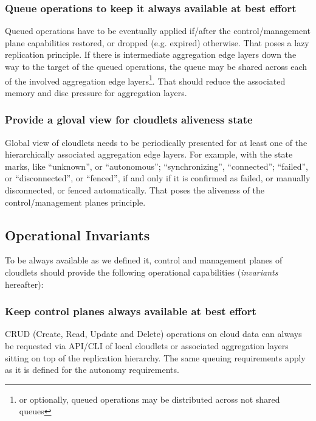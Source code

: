 \documentclass[conference]{IEEEtran}
\begin{document}
\subsubsection{Queue operations to keep it always available at best
effort}

Queued operations have to be eventually applied if/after the control/management
plane capabilities restored, or dropped (e.g. expired) otherwise. That poses a
lazy replication principle. If there is intermediate aggregation edge layers
down the way to the target of the queued operations, the queue may be shared
across each of the involved aggregation edge layers\footnote{or optionally,
queued operations may be distributed across not shared queues}. That should
reduce the associated memory and disc pressure for aggregation layers.

\subsubsection{Provide a gloval view for cloudlets aliveness state}

Global view of cloudlets needs to be periodically presented for at least one of
the hierarchically associated aggregation edge layers. For example, with the
state marks, like ``unknown'', or ``autonomous''; ``synchronizing'',
``connected''; ``failed'', or ``disconnected'', or ``fenced'', if and only if
it is confirmed as failed, or manually disconnected, or fenced automatically.
That poses the aliveness of the control/management planes principle.

\subsection{Operational Invariants}

To be always available as we defined it, control and management planes of
cloudlets should provide the following operational capabilities
(\textit{invariants} hereafter):

\subsubsection{Keep control planes always available at best effort}

CRUD (Create, Read, Update and Delete) operations on cloud data can always be
requested via API/CLI of local cloudlets or associated aggregation layers
sitting on top of the replication hierarchy. The same queuing requirements
apply as it is defined for the autonomy requirements.
\end{document}
